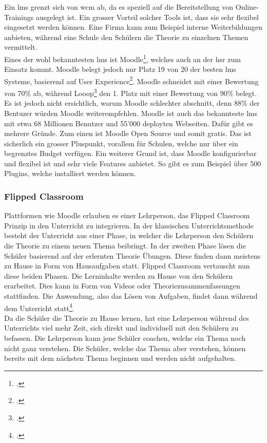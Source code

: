 Ein \gls{lms} grenzt sich von \gls{wcm} ab, da es speziell auf die Bereitstellung von Online-Trainings ausgelegt ist. Ein grosser Vorteil solcher Tools ist, dass sie sehr flexibel eingesetzt werden können. Eine Firma kann zum Beispiel interne Weiterbildungen anbieten, während eine Schule den Schülern die Theorie zu einzelnen Themen vermittelt. \\

Eines der wohl bekanntesten \gls{lms} ist Moodle\footcite{moodle_homepage}, welches auch an der \gls{hsr} zum Einsatz kommt. Moodle belegt jedoch nur Platz 19 von 20 der besten \gls{lms} Systeme, basierend auf User Experience\footcite{moodle_ux}. Moodle schneidet mit einer Bewertung von 70\% ab, während Looop\footcite{looop_homepage} den 1. Platz mit einer Bewertung von 90\% belegt. Es ist jedoch nicht ersichtlich, warum Moodle schlechter abschnitt, denn 88\% der Bentuzer würden Moodle weiterempfehlen. Moodle ist auch das bekannteste \gls{lms} mit etwa 68 Millionen Benutzer und 55'000 deployten Webseiten. Dafür gibt es mehrere Gründe. Zum einen ist Moodle Open Source und somit gratis. Das ist sicherlich ein grosser Pluspunkt, vorallem für Schulen, welche nur über ein begrenztes Budget verfügen. Ein weiterer Grund ist, dass Moodle konfigurierbar und flexibel ist und sehr viele Features anbietet. So gibt es zum Beispiel über 500 Plugins, welche installiert werden können. \\


\subsubsection{Flipped Classroom}
Plattformen wie Moodle erlauben es einer Lehrperson, das Flipped Classroom Prinzip in den Unterricht zu integrieren. In der klassischen Unterrichtsmethode besteht der Unterricht aus einer Phase, in welcher die Lehrperson den Schülern die Theorie zu einem neuen Thema beibringt. In der zweiten Phase lösen die Schüler basierend auf der erlernten Theorie Übungen. Diese finden dann meistens zu Hause in Form von Hausaufgaben statt. Flipped Classroom vertauscht nun diese beiden Phasen. Die Lerninhalte werden zu Hause von den Schülern erarbeitet. Dies kann in Form von Videos oder Theoriezusammenfassungen stattfinden. Die Anwendung, also das Lösen von Aufgaben, findet dann während dem Unterricht statt\footcite{flipped_classroom_theorie}. \\

Da die Schüler die Theorie zu Hause lernen, hat eine Lehrperson während des Unterrichts viel mehr Zeit, sich direkt und individuell mit den Schülern zu befassen. Die Lehrperson kann jene Schüler coachen, welche ein Thema noch nicht ganz verstehen. Die Schüler, welche das Thema aber verstehen, können bereits mit dem nächsten Thema beginnen und werden nicht aufgehalten. 

